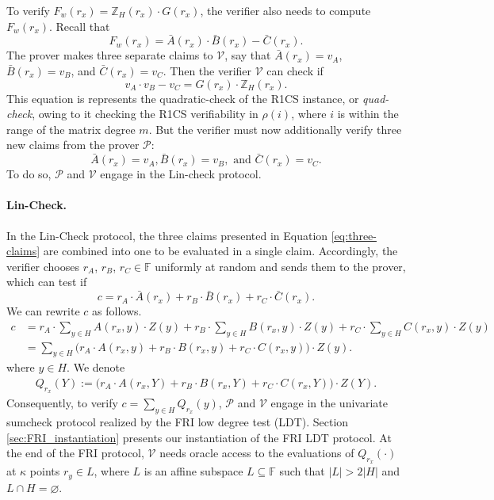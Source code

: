 To verify $F_w(r_x) = \mathbb{Z}_H(r_x) \cdot G(r_x)$, the verifier also needs to compute $F_w(r_x)$.
Recall that 
\begin{equation*}
	F_w(r_x) = \bar{A}(r_x) \cdot \bar{B}(r_x) - \bar{C}(r_x).
\end{equation*}
The prover makes three separate claims to $\mathcal{V}$, say that $\bar{A}(r_x)=v_A$, $\bar{B}(r_x)=v_B$, and $\bar{C}(r_x)=v_C$. Then the verifier $\mathcal{V}$ can check if
\[
v_A\cdot v_B - v_C=G(r_x)\cdot \mathbb{Z}_{H}(r_x).
\]
This equation is represents the quadratic-check of the R1CS instance, or \emph{quad-check}, owing to it checking the R1CS verifiability in $\rho(i)$, where $i$ is within the range of the matrix degree $m$. 
But the verifier must now additionally verify three new claims from the prover $\mathcal{P}$:
\begin{equation}
	\bar{A}(r_x) = v_A, \bar{B}(r_x) = v_B, \mbox{ and } \bar{C}(r_x) = v_C.
	\label{eq:three-claims}
\end{equation}
To do so, $\mathcal{P}$ and $\mathcal{V}$ engage in the Lin-check protocol.

\paragraph{Lin-Check.}\label{lin} 
In the Lin-Check protocol, the three claims presented in Equation \eqref{eq:three-claims} are combined into one to be evaluated in a single claim. Accordingly, the verifier chooses $r_A$, $r_B$, $r_C\in\mathbb{F}$ uniformly at random and sends them to the prover, which can test if
\begin{equation}\label{eq-c}
	c = r_A\cdot\bar{A}(r_x)+r_B\cdot\bar{B}(r_x)+r_C\cdot\bar{C}(r_x).
\end{equation}
We can rewrite $c$ as follows.
{\small
	\begin{align*}
		c & = r_A\cdot \sum_{y\in H}A(r_x,y)\cdot Z(y)+r_B\cdot \sum_{y\in H}B(r_x,y)\cdot Z(y) + r_C\cdot \sum_{y\in H}C(r_x,y)\cdot Z(y) \\
		& = \sum_{y\in H}\big(r_A\cdot A(r_x,y)+r_B\cdot B(r_x,y)+r_C\cdot C(r_x,y)\big)\cdot Z(y).
\end{align*}}
where $y \in H$.
We denote
\begin{multline}\label{Qy}
	Q_{r_x}(Y):= 
	\big(r_A\cdot A(r_x,Y)+r_B\cdot B(r_x,Y)+r_C\cdot C(r_x,Y)\big)\cdot Z(Y).
\end{multline}
Consequently, to verify $c=\sum_{y\in H} Q_{r_x}(y)$, $\mathcal{P}$ and $\mathcal{V}$ engage in the univariate sumcheck protocol realized by the FRI low degree test (LDT).  Section \ref{sec:FRI_instantiation} presents our instantiation of the FRI LDT protocol. 
At the end of the FRI protocol, $\mathcal{V}$ needs oracle access to the evaluations of $Q_{r_x}(\cdot)$ at $\kappa$ points $r_y \in L$, where $L$ is an affine subspace $L\subseteq\mathbb{F}$ such that $|L|>2|H|$ and $L\cap H=\varnothing$.

